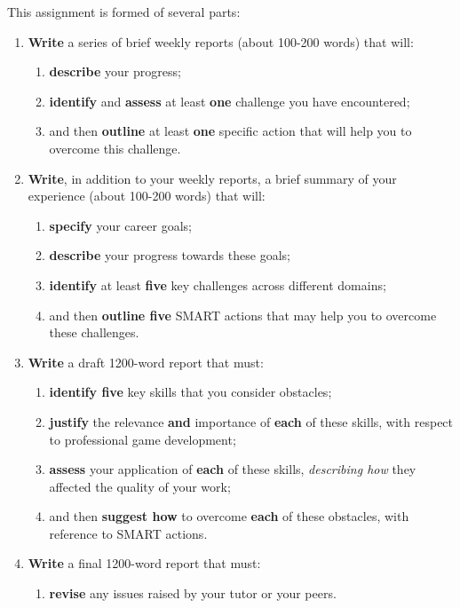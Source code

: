 \documentclass{../fal_assignment}
\begin{document}
This assignment is formed of several parts:

\begin{enumerate}[label=(\Alph*)]
    \item \textbf{Write} a series of brief weekly reports (about 100-200 words) that will:
    	\begin{enumerate}[label=\roman*.]
    		\item \textbf{describe} your progress;
    		\item \textbf{identify} and \textbf{assess} at least \textbf{one} challenge you have encountered;
    		\item and then \textbf{outline} at least \textbf{one} specific action that will help you to overcome this challenge.
	\end{enumerate}
	    \item \textbf{Write}, in addition to your weekly reports, a brief summary of your experience (about 100-200 words) that will:
    	\begin{enumerate}[label=\roman*.]
    		\item \textbf{specify} your career goals;
    		\item \textbf{describe} your progress towards these goals;
    		\item \textbf{identify} at least \textbf{five} key challenges across different domains;
    		\item and then \textbf{outline five} SMART actions that may help you to overcome these challenges.
	\end{enumerate}
    \item \textbf{Write} a draft 1200-word report that must:
    	\begin{enumerate}[label=\roman*.]
    		\item \textbf{identify five} key skills that you consider obstacles;
    		\item \textbf{justify} the relevance \textbf{and} importance of \textbf{each} of these skills, with respect to professional game development;
    		\item \textbf{assess} your application of \textbf{each} of these skills, \textit{describing how} they affected the quality of your work;
    		\item and then \textbf{suggest how} to overcome \textbf{each} of these obstacles, with reference to SMART actions.
	\end{enumerate}
    \item \textbf{Write} a final 1200-word report that must:
    	\begin{enumerate}[label=\roman*.]
    		\item \textbf{revise} any issues raised by your tutor or your peers.
	\end{enumerate}
\end{enumerate}
\end{document}
